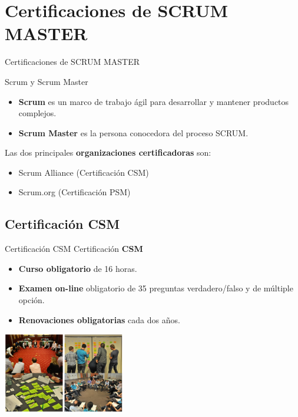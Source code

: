 
\section{Certificaciones de SCRUM MASTER}
\begin{frame}[allowframebreaks]{Certificaciones de SCRUM MASTER}
	
	Scrum y Scrum Master
	
	\begin{itemize}
		\item \textbf{Scrum} es un marco de trabajo ágil para desarrollar y mantener productos complejos.
		\item \textbf{Scrum Master} es la persona conocedora del proceso SCRUM.
	\end{itemize}


	Las dos principales \textbf{organizaciones certificadoras} son:
	\begin{itemize}
		\item Scrum Alliance (Certificación CSM)
		\item Scrum.org (Certificación PSM)
	\end{itemize}

\end{frame}

\subsection{Certificación CSM}

\begin{frame}{Certificación CSM}
	Certificación \textbf{CSM} 
	\begin{itemize}
		\item \textbf{Curso obligatorio} de 16 horas.
		\item \textbf{Examen on-line} obligatorio de 35 preguntas verdadero/falso y de múltiple opción.
		\item \textbf{Renovaciones obligatorias} cada dos años.
	\end{itemize}

	\begin{center}
		\includegraphics[height=3.5cm]{figuras/curso_scrum.png}
	\end{center}

\end{frame}

